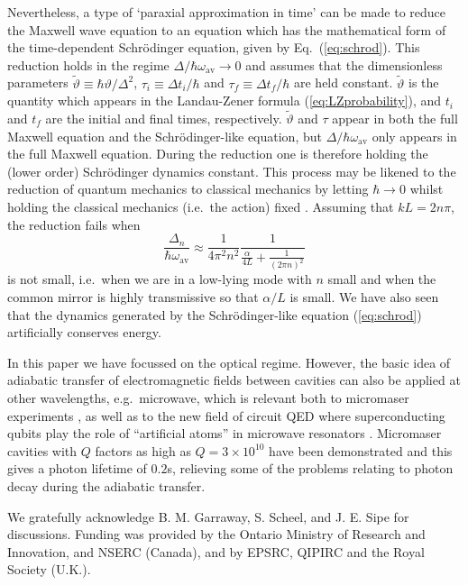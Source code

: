 \documentclass[twocolumn,english,pra,aps,superscriptaddress,floatfix]{revtex4-1}
\begin{document}
Nevertheless, a type of `paraxial approximation in time' can be made to reduce the Maxwell wave equation to an equation which has the mathematical form of the time-dependent Schr\"{o}dinger equation, given by Eq.\ (\ref{eq:schrod}). This reduction holds in the regime $\Delta/\hbar \omega_{\mathrm{av}} \rightarrow 0$ and assumes that the dimensionless parameters $\tilde{\vartheta} \equiv \hbar \vartheta/ \Delta^2$, $\tau_{i} \equiv \Delta t_{i}/\hbar$ and $\tau_{f} \equiv \Delta t_{f}/\hbar$ are held constant. $\tilde{\vartheta}$ is the quantity which appears in the Landau-Zener formula (\ref{eq:LZprobability}), and $t_{i}$ and $t_{f}$ are the initial and final times, respectively.  $\tilde{\vartheta}$ and $\tau$ appear in both the full Maxwell equation and  the Schr\"{o}dinger-like equation, but $\Delta/\hbar \omega_{\mathrm{av}}$ only appears in the full Maxwell equation. During the reduction one is therefore holding the (lower order) Schr\"{o}dinger dynamics constant. This process may be likened to the reduction of quantum mechanics to classical mechanics by letting $\hbar \rightarrow 0$ whilst holding the classical mechanics (i.e.\ the action) fixed \cite{berry+mount}. Assuming that $kL=2 n \pi$, the reduction fails when
\begin{equation}
\frac{\Delta_{n}}{\hbar \omega_{\mathrm{av}}} \approx \frac{1}{4 \pi^2 n^2}\frac{1}{\frac{\alpha}{4L}+\frac{1}{(2 \pi n)^2}}
\end{equation}
is not small, i.e.\ when we are in a low-lying mode with $n$ small and when the common mirror is highly transmissive so that $\alpha/L$ is small.  We have also seen that the dynamics generated by the Schr\"{o}dinger-like equation (\ref{eq:schrod}) artificially conserves energy.



In this paper we have focussed on the optical regime. However, the basic idea of adiabatic transfer of electromagnetic fields between cavities can also be applied at other wavelengths, e.g.\ microwave, which is relevant both to micromaser experiments \cite{raimond01,weidinger99}, as well as to the new field of circuit QED where superconducting qubits play the role of  ``artificial atoms''  in microwave resonators \cite{walraff04}. Micromaser cavities with $Q$ factors as high as $Q=3 \times 10^{10}$ have been demonstrated \cite{weidinger99} and this gives a photon lifetime of $0.2$s, relieving some of the problems relating to photon decay during the adiabatic transfer.

\begin{acknowledgements}
We gratefully acknowledge B. M. Garraway, S. Scheel, and J. E. Sipe for discussions. Funding was provided by the Ontario Ministry of Research and Innovation, and NSERC (Canada), and by EPSRC, QIPIRC and the Royal Society (U.K.).
\end{acknowledgements}
\end{document}
